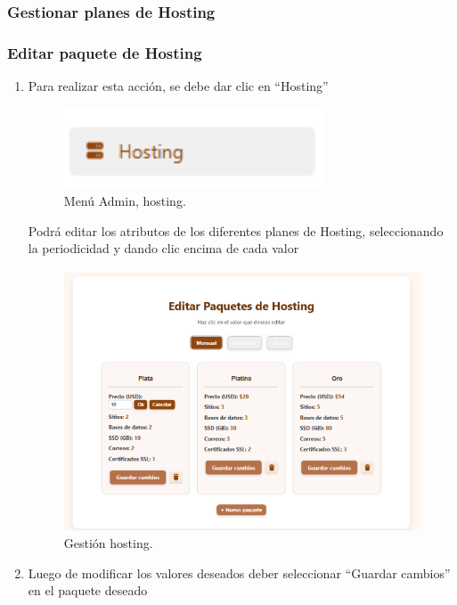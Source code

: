 \subsubsection{Gestionar planes de Hosting}

\subsubsection*{Editar paquete de Hosting}

\begin{enumerate}
    \item Para realizar esta acción, se debe dar clic en “Hosting”
    \begin{figure}[H]
        \centering
        \includegraphics[width=0.3\linewidth]{guiamodulo/menu-admin-hosting.png}
        \caption{Menú Admin, hosting.}
        \label{fig:menu-admin-hosting}
    \end{figure}

    Podrá editar los atributos de los diferentes planes de Hosting, seleccionando la periodicidad y dando clic encima de cada valor

    \begin{figure}[H]
        \centering
        \includegraphics[width=0.7\linewidth]{guiamodulo/gestion-hosting.png}
        \caption{Gestión hosting.}
        \label{fig:gestion-hosting.png}
    \end{figure}

    \item Luego de modificar los valores deseados deber seleccionar “Guardar cambios” en el paquete deseado


\end{enumerate}
